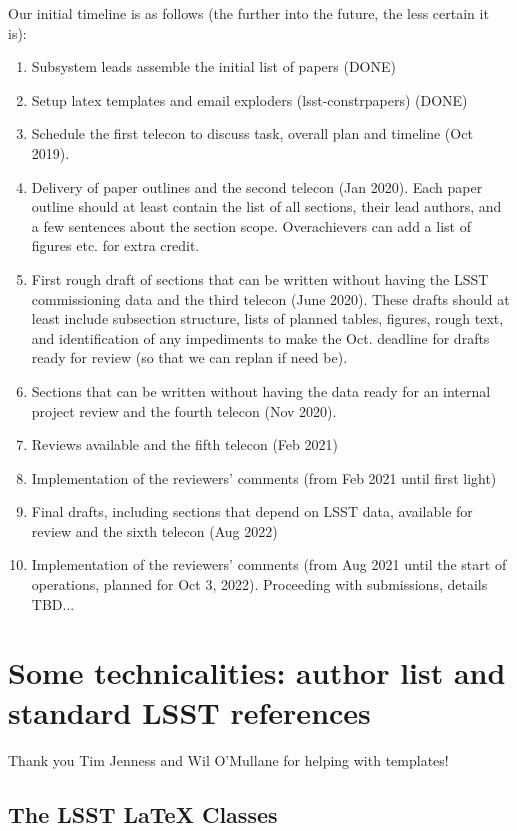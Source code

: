 Our initial timeline is as follows (the further into the future, the less certain it is): 
\begin{enumerate} 
\item 
Subsystem leads assemble the initial list of papers (DONE)
\item
Setup latex templates and email exploders (lsst-constrpapers) (DONE)
\item
Schedule the first telecon to discuss task, overall plan and timeline (Oct 2019).
\item 
Delivery of paper outlines and the second telecon (Jan 2020). Each paper
outline should at least contain the list of all sections, their lead authors, and
a few sentences about the section scope. Overachievers can add a list of figures etc.
for extra credit. 
\item
First rough draft of sections that can be written without having the LSST commissioning
data and the third telecon (June 2020). These drafts should at least include subsection
structure, lists of planned tables, figures, rough text,  and identification of any impediments 
to make the Oct. deadline for drafts ready for review (so that we can replan if need be). 
\item 
Sections that can be written without having the data ready for an internal project review and
the fourth telecon (Nov 2020). 
\item
Reviews available and the fifth telecon (Feb 2021)
\item
Implementation of the reviewers' comments (from Feb 2021 until first light) 
\item 
Final drafts, including sections that depend on LSST data, available for
review and the sixth telecon (Aug 2022)
\item
Implementation of the reviewers' comments (from Aug 2021 until the start of operations, 
planned for Oct 3, 2022).  Proceeding with submissions, details TBD...
\end{enumerate}




\section{Some technicalities: author list and standard LSST references} 

Thank you Tim Jenness and Wil O'Mullane for helping with templates! 

\subsection{The LSST LaTeX Classes}

